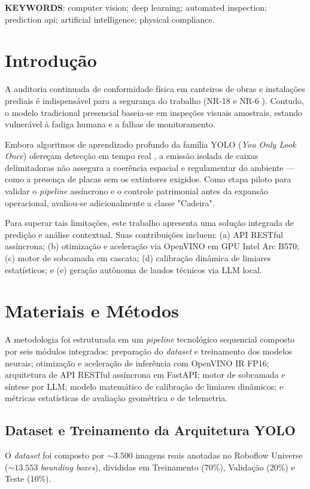 \documentclass[a4paper,11pt]{article}
\begin{document}
\vspace{0.15cm}
\noindent\textbf{KEYWORDS}: computer vision; deep learning; automated inspection; prediction api; artificial intelligence; physical compliance.

\section*{Introdução}
A auditoria continuada de conformidade física em canteiros de obras e instalações prediais é indispensável para a segurança do trabalho (NR-18 \cite{brasil_nr18} e NR-6 \cite{brasil_nr6}). Contudo, o modelo tradicional presencial baseia-se em inspeções visuais amostrais, estando vulnerável à fadiga humana e a falhas de monitoramento.

Embora algoritmos de aprendizado profundo da família YOLO (\textit{You Only Look Once}) ofereçam detecção em tempo real \cite{redmon2016you, terven2023comprehensive}, a emissão isolada de caixas delimitadoras não assegura a coerência espacial e regulamentar do ambiente \cite{rahman2021context} — como a presença de placas sem os extintores exigidos. Como etapa piloto para validar o \textit{pipeline} assíncrono e o controle patrimonial antes da expansão operacional, avaliou-se adicionalmente a classe "Cadeira".

Para superar tais limitações, este trabalho apresenta uma solução integrada de predição e análise contextual. Suas contribuições incluem: (a) API RESTful assíncrona; (b) otimização e aceleração via OpenVINO em GPU Intel Arc B570; (c) motor de sobcamada em cascata; (d) calibração dinâmica de limiares estatísticos; e (e) geração autônoma de laudos técnicos via LLM local.

\section*{Materiais e Métodos}
A metodologia foi estruturada em um \textit{pipeline} tecnológico sequencial composto por seis módulos integrados: preparação do \textit{dataset} e treinamento dos modelos neurais; otimização e aceleração de inferência com OpenVINO IR FP16; arquitetura de API RESTful assíncrona em FastAPI; motor de sobcamada e síntese por LLM; modelo matemático de calibração de limiares dinâmicos; e métricas estatísticas de avaliação geométrica e de telemetria.

\subsection*{Dataset e Treinamento da Arquitetura YOLO}
O \textit{dataset} foi composto por $\sim 3.500$ imagens reais anotadas no Roboflow Universe \cite{roboflow2026} ($\sim 13.553$ \textit{bounding boxes}), divididas em Treinamento (70\%), Validação (20\%) e Teste (10\%). 
\end{document}

